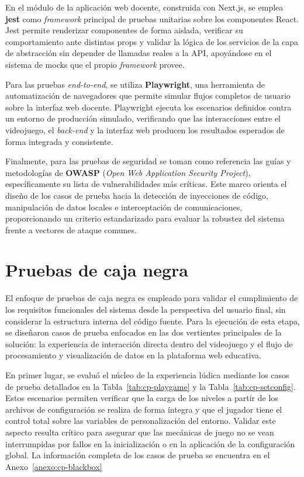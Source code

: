 En el módulo de la aplicación web docente, construida con Next.js, se emplea \textbf{jest} como \textit{framework} principal de pruebas unitarias sobre los componentes React. Jest permite renderizar componentes de forma aislada, verificar su comportamiento ante distintas props y validar la lógica de los servicios de la capa de abstracción sin depender de llamadas reales a la API, apoyándose en el sistema de mocks que el propio \textit{framework} provee.

Para las pruebas \textit{end-to-end}, se utiliza \textbf{Playwright}, una herramienta de automatización de navegadores que permite simular flujos completos de usuario sobre la interfaz web docente. Playwright ejecuta los escenarios definidos contra un entorno de producción simulado, verificando que las interacciones entre el videojuego, el \textit{back-end} y la interfaz web producen los resultados esperados de forma integrada y consistente.

Finalmente, para las pruebas de seguridad se toman como referencia las guías y metodologías de \textbf{OWASP} (\textit{Open Web Application Security Project}), específicamente su lista de vulnerabilidades más críticas. Este marco orienta el diseño de los casos de prueba hacia la detección de inyecciones de código, manipulación de datos locales e interceptación de comunicaciones, proporcionando un criterio estandarizado para evaluar la robustez del sistema frente a vectores de ataque comunes.

\section{Pruebas de caja negra}

El enfoque de pruebas de caja negra es empleado para validar el cumplimiento de los requisitos funcionales del sistema desde la perspectiva del usuario final, sin considerar la estructura interna del código fuente. Para la ejecución de esta etapa, se diseñaron casos de prueba enfocados en las dos vertientes principales de la solución: la experiencia de interacción directa dentro del videojuego y el flujo de procesamiento y visualización de datos en la plataforma web educativa.

En primer lugar, se evaluó el núcleo de la experiencia lúdica mediante los casos de prueba detallados en la Tabla~\ref{tab:cp-playgame} y la Tabla~\ref{tab:cp-setconfig}. Estos escenarios permiten verificar que la carga de los niveles a partir de los archivos de configuración se realiza de forma íntegra y que el jugador tiene el control total sobre las variables de personalización del entorno. Validar este aspecto resulta crítico para asegurar que las mecánicas de juego no se vean interrumpidas por fallos en la inicialización o en la aplicación de la configuración global. La información completa de los casos de prueba se encuentra en el Anexo~\ref{anexo:cp-blackbox}

